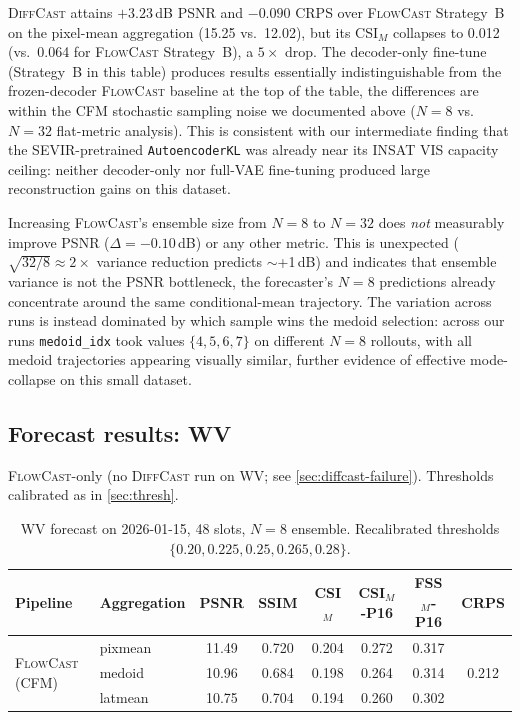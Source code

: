 \documentclass[11pt,a4paper]{article}
\begin{document}
\textsc{DiffCast} attains $+3.23$\,dB PSNR and $-0.090$ CRPS over
\textsc{FlowCast} Strategy~B on the pixel-mean aggregation
(15.25 vs.\ 12.02), but its CSI$_M$ collapses to 0.012 (vs.\ 0.064
for \textsc{FlowCast} Strategy~B), a $5\!\times$ drop. The decoder-only
fine-tune (Strategy~B in this table) produces results essentially
indistinguishable from the frozen-decoder \textsc{FlowCast} baseline at
the top of the table, the differences are within the CFM stochastic
sampling noise we documented above ($N=8$ vs.\ $N=32$ flat-metric
analysis). This is consistent with our intermediate finding that the
\textsc{SEVIR}-pretrained \texttt{AutoencoderKL} was already near its
INSAT VIS capacity ceiling: neither decoder-only nor full-VAE fine-tuning
produced large reconstruction gains on this dataset.

Increasing \textsc{FlowCast}'s ensemble size from $N=8$ to $N=32$ does
\emph{not} measurably improve PSNR ($\Delta=-0.10$\,dB) or any other metric.
This is unexpected ($\sqrt{32/8}\!\approx\!2\times$ variance reduction
predicts $\sim$+1\,dB) and indicates that ensemble variance is not the
PSNR bottleneck, the forecaster's $N=8$ predictions already concentrate
around the same conditional-mean trajectory. The variation across runs is
instead dominated by which sample wins the medoid selection: across our
runs \texttt{medoid\_idx} took values $\{4, 5, 6, 7\}$ on different
$N\!=\!8$ rollouts, with all medoid trajectories appearing visually
similar, further evidence of effective mode-collapse on this small
dataset.

\subsection{Forecast results: WV}
\label{sec:wv-results}
\textsc{FlowCast}-only (no \textsc{DiffCast} run on WV; see
\cref{sec:diffcast-failure}). Thresholds calibrated as in \cref{sec:thresh}.

\begin{table}[h]
\centering\small
\caption{WV forecast on 2026-01-15, 48 slots, $N=8$ ensemble.
Recalibrated thresholds $\{0.20, 0.225, 0.25, 0.265, 0.28\}$.}
\label{tab:wv-results}
\begin{tabular}{l|l|cccccc}
\toprule
Pipeline & Aggregation & PSNR & SSIM & CSI$_M$ & CSI$_M$-P16 & FSS$_M$-P16 & CRPS \\
\midrule
\multirow{3}{*}{\textsc{FlowCast} (CFM)}
 & pixmean   & 11.49 & 0.720 & 0.204 & 0.272 & 0.317 & \multirow{3}{*}{0.212} \\
 & medoid    & 10.96 & 0.684 & 0.198 & 0.264 & 0.314 & \\
 & latmean   & 10.75 & 0.704 & 0.194 & 0.260 & 0.302 & \\
\bottomrule
\end{tabular}
\end{table}
\end{document}
